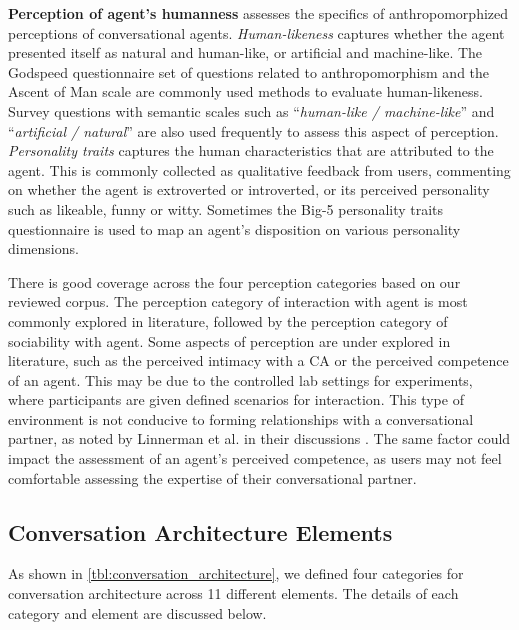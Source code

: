 \textbf{Perception of agent's humanness} assesses the specifics of anthropomorphized perceptions of conversational agents. \textit{Human-likeness} captures whether the agent presented itself as natural and human-like, or artificial and machine-like. The Godspeed questionnaire \cite{bartneck2009measurement} set of questions related to anthropomorphism and the Ascent of Man scale \cite{kteily2015ascent} are commonly used methods to evaluate human-likeness. Survey questions with semantic scales such as ``\textit{human-like / machine-like}'' and ``\textit{artificial / natural}'' are also used frequently to assess this aspect of perception. \textit{Personality traits} captures the human characteristics that are attributed to the agent. This is commonly collected as qualitative feedback from users, commenting on whether the agent is extroverted or introverted, or its perceived personality such as likeable, funny or witty. Sometimes the Big-5 personality traits questionnaire \cite{gosling2003very} is used to map an agent's disposition on various personality dimensions.

There is good coverage across the four perception categories based on our reviewed corpus. The perception category of interaction with agent is most commonly explored in literature, followed by the perception category of sociability with agent. Some aspects of perception are under explored in literature, such as the perceived intimacy with a CA or the perceived competence of an agent. This may be due to the controlled lab settings for experiments, where participants are given defined scenarios for interaction. This type of environment is not conducive to forming relationships with a conversational partner, as noted by Linnerman et al. in their discussions \cite{linnemann2018can}\cmt{[15]}. The same factor could impact the assessment of an agent's perceived competence, as users may not feel comfortable assessing the expertise of their conversational partner. 



\subsection{Conversation Architecture Elements}

As shown in \autoref{tbl:conversation_architecture}, we defined four categories for conversation architecture across 11 different elements. The details of each category and element are discussed below.

